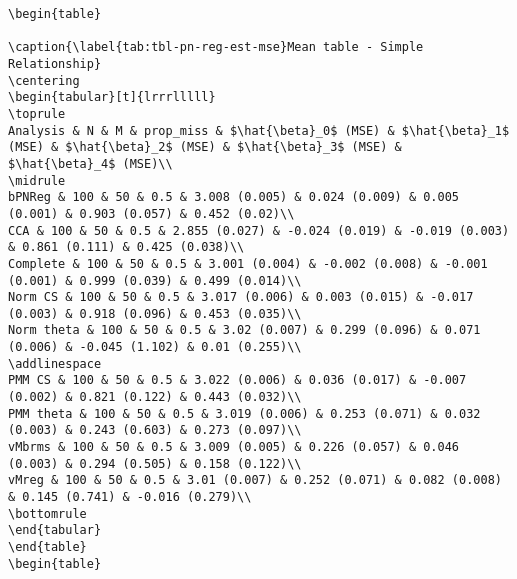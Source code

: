\documentclass[
]{article}
\begin{document}
\begin{table}

\caption{\textbf{?(caption)}}\begin{minipage}[t]{\linewidth}

{\centering 

\begin{verbatim}
\begin{table}

\caption{\label{tab:tbl-pn-reg-est-mse}Mean table - Simple Relationship}
\centering
\begin{tabular}[t]{lrrrlllll}
\toprule
Analysis & N & M & prop_miss & $\hat{\beta}_0$ (MSE) & $\hat{\beta}_1$ (MSE) & $\hat{\beta}_2$ (MSE) & $\hat{\beta}_3$ (MSE) & $\hat{\beta}_4$ (MSE)\\
\midrule
bPNReg & 100 & 50 & 0.5 & 3.008 (0.005) & 0.024 (0.009) & 0.005 (0.001) & 0.903 (0.057) & 0.452 (0.02)\\
CCA & 100 & 50 & 0.5 & 2.855 (0.027) & -0.024 (0.019) & -0.019 (0.003) & 0.861 (0.111) & 0.425 (0.038)\\
Complete & 100 & 50 & 0.5 & 3.001 (0.004) & -0.002 (0.008) & -0.001 (0.001) & 0.999 (0.039) & 0.499 (0.014)\\
Norm CS & 100 & 50 & 0.5 & 3.017 (0.006) & 0.003 (0.015) & -0.017 (0.003) & 0.918 (0.096) & 0.453 (0.035)\\
Norm theta & 100 & 50 & 0.5 & 3.02 (0.007) & 0.299 (0.096) & 0.071 (0.006) & -0.045 (1.102) & 0.01 (0.255)\\
\addlinespace
PMM CS & 100 & 50 & 0.5 & 3.022 (0.006) & 0.036 (0.017) & -0.007 (0.002) & 0.821 (0.122) & 0.443 (0.032)\\
PMM theta & 100 & 50 & 0.5 & 3.019 (0.006) & 0.253 (0.071) & 0.032 (0.003) & 0.243 (0.603) & 0.273 (0.097)\\
vMbrms & 100 & 50 & 0.5 & 3.009 (0.005) & 0.226 (0.057) & 0.046 (0.003) & 0.294 (0.505) & 0.158 (0.122)\\
vMreg & 100 & 50 & 0.5 & 3.01 (0.007) & 0.252 (0.071) & 0.082 (0.008) & 0.145 (0.741) & -0.016 (0.279)\\
\bottomrule
\end{tabular}
\end{table}
\begin{table}


\end{verbatim}}
\end{minipage}
\end{table}
\end{document}
